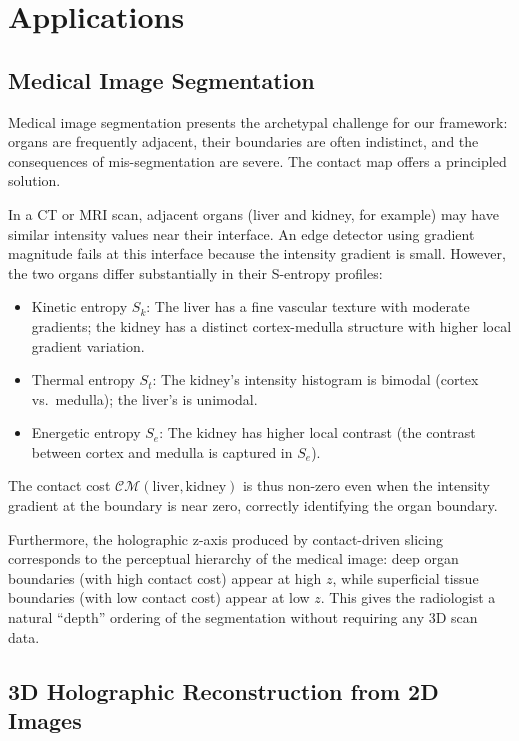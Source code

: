 \documentclass[twocolumn]{article}
\theoremstyle{plain}
\theoremstyle{definition}
\newcommand{\CM}{\mathcal{CM}}
\newcommand{\Sk}{S_k}
\newcommand{\St}{S_t}
\newcommand{\Se}{S_e}
\begin{document}
\section{Applications}
\label{sec:applications}

\subsection{Medical Image Segmentation}

Medical image segmentation presents the archetypal challenge for our framework:
organs are frequently adjacent, their boundaries are often indistinct, and the
consequences of mis-segmentation are severe. The contact map offers a principled
solution.

In a CT or MRI scan, adjacent organs (liver and kidney, for example) may have
similar intensity values near their interface. An edge detector using gradient
magnitude fails at this interface because the intensity gradient is small.
However, the two organs differ substantially in their S-entropy profiles:
\begin{itemize}
\item Kinetic entropy $\Sk$: The liver has a fine vascular texture with moderate
  gradients; the kidney has a distinct cortex-medulla structure with higher
  local gradient variation.
\item Thermal entropy $\St$: The kidney's intensity histogram is bimodal (cortex
  vs.\ medulla); the liver's is unimodal.
\item Energetic entropy $\Se$: The kidney has higher local contrast (the contrast
  between cortex and medulla is captured in $\Se$).
\end{itemize}
The contact cost $\CM(\text{liver}, \text{kidney})$ is thus non-zero even when
the intensity gradient at the boundary is near zero, correctly identifying the
organ boundary.

Furthermore, the holographic z-axis produced by contact-driven slicing corresponds
to the perceptual hierarchy of the medical image: deep organ boundaries (with
high contact cost) appear at high $z$, while superficial tissue boundaries (with
low contact cost) appear at low $z$. This gives the radiologist a natural
``depth'' ordering of the segmentation without requiring any 3D scan data.

\subsection{3D Holographic Reconstruction from 2D Images}
\end{document}
